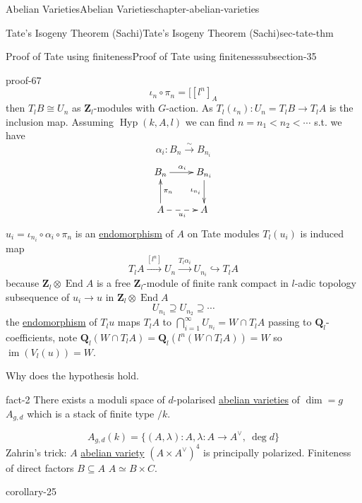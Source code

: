 \documentclass[oneside,10pt,]{book}
\numberwithin{equation}{section}
\newcommand{\lb}{[}
\newcommand{\ZZ}{\mathbf{Z}}
\newcommand{\QQ}{\mathbf{Q}}
\DeclareMathOperator{\End}{End}
\DeclareMathOperator{\image}{im}
\newcommand{\lt}{<}
\begin{document}
\begin{chapterptx}{Abelian Varieties}{}{Abelian Varieties}{}{}{chapter-abelian-varieties}
\begin{sectionptx}{Tate's Isogeny Theorem (Sachi)}{}{Tate's Isogeny Theorem (Sachi)}{}{}{sec-tate-thm}
\begin{subsectionptx}{Proof of Tate using finiteness}{}{Proof of Tate using finiteness}{}{}{subsection-35}
\begin{proofptx}{}{proof-67}
\begin{equation*}
\iota_n \circ \pi_n  =  \lb [l^n]_A
\end{equation*}
then \(T_lB \cong U_n\) as \(\ZZ_l\)-modules with \(G\)-action. As \(T_l(\iota_n) \colon U_n =T_l B  \to T_l A\) is the inclusion map. Assuming \(\operatorname{Hyp}(k,A,l)\) we can find \(n = n_1 \lt n_2 \lt \cdots\) s.t. we have%
\begin{equation*}
\alpha_i \colon B_n \xrightarrow{\sim} B_{n_i}
\end{equation*}
%
\begin{equation*}
\xymatrix{
B_n \ar[r]^{\alpha_i} & B_{n_i} \ar[d]_{\iota_{n_i}}\\
A\ar[u]_{\pi_n} \ar@{-->}_{u_i}[r] & A
}
\end{equation*}
\(u_i = \iota_{n_i} \circ \alpha_i \circ \pi_n\) is an \hyperref[def-supersing-isog-endo]{endomorphism} of \(A\) on Tate modules \(T_l(u_i)\) is induced map%
\begin{equation*}
T_l A \xrightarrow{[l^n]} U_n \xrightarrow{T_l\alpha_i} U_{n_i} \hookrightarrow T_l A
\end{equation*}
because \(\ZZ_l \otimes \End A\) is a free \(\ZZ_l\)-module of finite rank compact in \(l\)-adic topology subsequence of \(u_i \to u\) in \(\ZZ_l \otimes \End A\)%
\begin{equation*}
U_{n_1} \supseteq U_{n_2} \supseteq \cdots
\end{equation*}
the \hyperref[def-supersing-isog-endo]{endomorphism} of \(T_l u\) maps \(T_l A\) to \(\bigcap_{i=1}^\infty U_{n_i} = W\cap T_l A\) passing to \(\QQ_l\)-coefficients, note \(\QQ_l(W\cap T_l A) = \QQ_l(l^n(W\cap T_l A)) = W\) so \(\image(V_l(u)) =W\).%
\end{proofptx}
\hypertarget{p-395}{}%
Why does the hypothesis hold.%
\begin{fact}{}{}{fact-2}%
\hypertarget{p-396}{}%
There exists a moduli space of \(d\)-polarised \hyperref[def-buntes-abvar]{abelian varieties} of \(\dim = g\) \(A_{g,d}\) which is a stack of finite type \(/k\).%
\end{fact}
\hypertarget{p-397}{}%
%
\begin{equation*}
A_{g,d}( k) = \{(A,\lambda) : A , \lambda \colon A \to A^\vee,\ \deg d \}
\end{equation*}
Zahrin's trick: \(A\) \hyperref[def-buntes-abvar]{abelian variety} \((A\times A^\vee)^4\) is principally polarized. Finiteness of direct factors \(B\subseteq A\) \(A\simeq B\times C\).%
\begin{corollary}{}{}{corollary-25}%

\end{corollary}
\end{subsectionptx}
\end{sectionptx}
\end{chapterptx}
\end{document}
